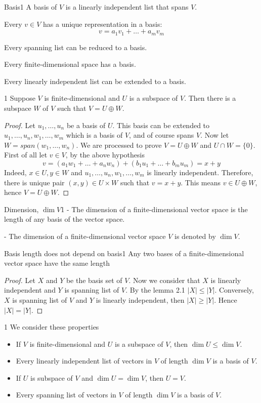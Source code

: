 \documentclass[11pt]{article}
\begin{document}
\begin{definition}{Basis}{1}
  A basis of $V$ is a linearly independent list that spans $V$.

Every $v \in V$ has a unique representation in a basis:
\[
  v = a_1v_1 + \dots + a_mv_m
\]
\end{definition}

Every spanning list can be reduced to a basis. 

Every finite-dimensional space has a basis. 

Every linearly independent list can be extended to a basis.
\begin{theorem}{}{1}
  Suppose $V$ is finite-dimensional and $U$ is a subspace of $V$. Then there is a subspace $W$ of $V$ such that $V = U \oplus W$.
\end{theorem}
\begin{proof}
  Let $u_1,\dots,u_n$ be a basis of $U$. This basis can be extended to $u_1,\dots,u_n,w_1,\dots,w_m$ which is a basis of $V$, and of course spans $V$. Now let $W = span(w_1,\dots,w_n)$. We are processed to prove $V = U \oplus W$ and $U \cap W = \{0\}$. First of all let $v \in V$, by the above hypothesis
  $$v = (a_1w_1 + \dots + a_nw_n )+( b_1u_1 + \dots + b_mu_m) = x +y$$
  Indeed, $x \in U, y \in W$ and $u_1,\dots,u_n,w_1,\dots,w_m$ is linearly independent. Therefore, there is unique pair $(x,y) \in U \times W$ such that $v = x + y$. This means $v \in U \oplus W$, hence $V = U \oplus W$.
  
\end{proof}
\begin{definition}{Dimension, $\dim V$}{1}
- The dimension of a finite-dimensional vector space is the length of any
basis of the vector space.

  - The dimension of a finite-dimensional vector space $V$ is denoted by $\dim V$.
\end{definition}
\begin{theorem}{Basis length does not depend on basis}{1}
  Any two bases of a finite-dimensional vector space have the same length
\end{theorem}
\begin{proof}
  Let $X$ and $Y$ be the basis set of $V$. Now we consider that $X$ is linearly independent and $Y$ is spanning list of $V$. By the lemma 2.1 $|X| \leq |Y|$. Conversely, $X$ is spanning list of $V$ and $Y$ is linearly independent, then $|X| \geq |Y|$. Hence $|X| = |Y|$.
\end{proof}
\begin{definition}{}{1}
We consider these properties
\begin{itemize}[label=-]
  \item If $V$ is finite-dimensional and $U$ is a subspace of $V$, then $\dim U \leq \dim V$.
  \item Every linearly independent list of vectors in $V$ of length $\dim V$ is a basis of $V$.
  \item If $U$ is subspace of $V$ and $\dim U = \dim V$, then $U = V$.
  \item Every spanning list of vectors in $V$ of length $\dim V$ is a basis of $V$.
\end{itemize}  
\end{definition}
\end{document}
